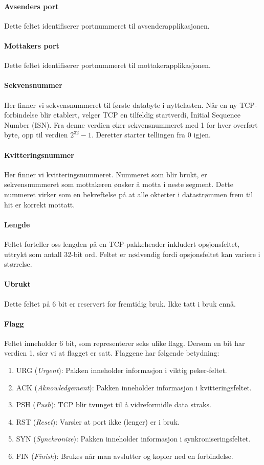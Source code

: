 \documentclass[11pt,a4paper]{article}
\begin{document}
\paragraph{Avsenders port} Dette feltet identifiserer portnummeret til avsenderapplikasjonen.
\paragraph{Mottakers port} Dette feltet identifiserer portnummeret til mottakerapplikasjonen.
\paragraph{Sekvensnummer} Her finner vi sekvensnummeret til første databyte i nyttelasten. Når en ny TCP-forbindelse blir etablert, velger TCP en tilfeldig startverdi, Initial Sequence Number (ISN). Fra denne verdien øker sekvensnummeret med 1 for hver overført byte, opp til verdien $2^{32}-1$. Deretter starter tellingen fra 0 igjen.
\paragraph{Kvitteringsnummer} Her finner vi kvitteringsnummeret. Nummeret som blir brukt, er sekvensnummeret som mottakeren ønsker å motta i neste segment. Dette nummeret virker som en bekreftelse på at alle oktetter i datastrømmen frem til hit er korrekt mottatt.
\paragraph{Lengde} Feltet forteller oss lengden på en TCP-pakkeheader inkludert opsjonsfeltet, uttrykt som antall 32-bit ord. Feltet er nødvendig fordi opsjonsfeltet kan variere i størrelse.
\paragraph{Ubrukt} Dette feltet på 6 bit er reservert for fremtidig bruk. Ikke tatt i bruk ennå.
\paragraph{Flagg} Feltet inneholder 6 bit, som representerer seks ulike flagg. Dersom en bit har verdien 1, sier vi at flagget er satt. Flaggene har følgende betydning:
\begin{enumerate}
\item{URG (\textit{Urgent}): Pakken inneholder informasjon i viktig peker-feltet.}
\item{ACK (\textit{Aknowledgement}): Pakken inneholder informasjon i kvitteringsfeltet.}
\item{PSH (\textit{Push}): TCP blir tvunget til å vidreformidle data straks.}
\item{RST (\textit{Reset}): Varsler at port ikke (lenger) er i bruk.}
\item{SYN (\textit{Synchronize}): Pakken inneholder informasjon i synkroniseringsfeltet.}
\item{FIN (\textit{Finish}): Brukes når man avslutter og kopler ned en forbindelse.}
\end{enumerate}
\end{document}
